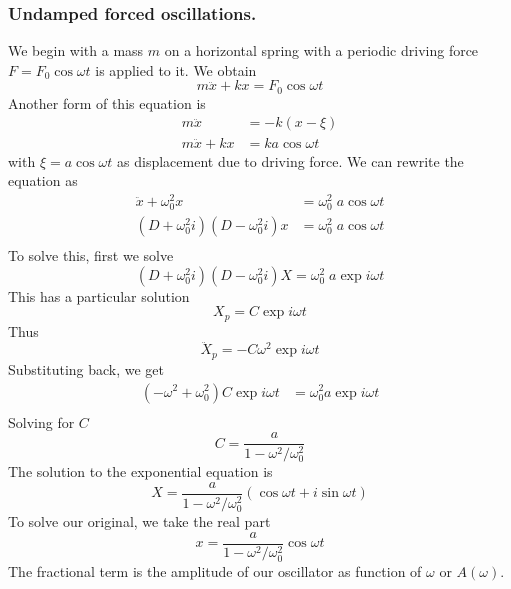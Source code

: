 \documentclass[../../main.tex]{subfiles}
\begin{document}
\subsubsection{Undamped forced oscillations.} We begin with a mass $m$ on a horizontal spring with a periodic driving force $F = F_0 \cos \omega t$ is applied to it. We obtain
\begin{equation*}
    m\ddot{x}+kx=F_0 \cos \omega t
\end{equation*}
Another form of this equation is 
\begin{align*}
    m\ddot{x}&=-k(x-\xi)\\
    m\ddot{x}+kx&=ka \cos \omega t
\end{align*}
with $\xi=a \cos \omega t$ as displacement due to driving force. We can rewrite the equation as
\begin{align*}
    \ddot{x}+\omega_0^2x&=\omega_0^2\;a \cos \omega t\\
    (D+\omega_0^2i)(D-\omega_0^2i)x&=\omega_0^2\;a\cos \omega t\\
\end{align*}
To solve this, first we solve 
\begin{equation*}
    (D+\omega_0^2i)(D-\omega_0^2i)X=\omega_0^2\;a\exp i\omega t
\end{equation*}
This has a particular solution
\begin{equation*}
    X_p=C\exp{i\omega t}
\end{equation*}
Thus
\begin{equation*}
    \ddot{X}_p=-C\omega^2\exp{i\omega t}
\end{equation*}
Substituting back, we get
\begin{align*}
    (-\omega^2+\omega_0^2)C\exp{i\omega t}&=\omega_0^2a\exp{i\omega t}\\
\end{align*}
Solving for $C$
\begin{equation*}
    C=\frac{a}{1-\omega^2/\omega_0^2}
\end{equation*}
The solution to the exponential equation is 
\begin{equation*}
    X=\frac{a}{1-\omega^2/\omega_0^2}(\cos\omega t+i\sin \omega t)
\end{equation*}
To solve our original, we take the real part 
\begin{equation*}
    x=\frac{a}{1-\omega^2/\omega_0^2}\cos\omega t
\end{equation*}
The fractional term is the amplitude of our oscillator as function of $\omega$ or $A(\omega)$.
\end{document}
